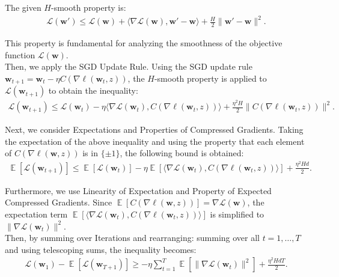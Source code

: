 \documentclass[letterpaper]{article}
\newcommand{\E}{\mathop{\mathbb{E}}}
\renewcommand{\L}{\mathcal{L}}
\newcommand{\bw}{\mathbf{w}}
\begin{document}
\begin{enumerate}
\begin{enumerate}
        The given \(H\)-smooth property is:
         \begin{equation}
        	\begin{aligned}
        		\L(\bw') \le \L(\bw) + \langle \nabla \L(\bw), \bw' - \bw \rangle + \frac{H}{2} \|\bw' - \bw\|^2.
        	\end{aligned}
        \end{equation}

        This property is fundamental for analyzing the smoothness of the objective function \(\L(\bw)\).\\
        
        Then, we apply the SGD Update Rule. Using the SGD update rule \(\bw_{t+1} = \bw_t - \eta C(\nabla \ell(\bw_t, z))\), the \(H\)-smooth property is applied to \(\L(\bw_{t+1})\) to obtain the inequality:
        \begin{equation}
        	\begin{aligned}
        		\L(\bw_{t+1}) \le \L(\bw_t) - \eta \langle \nabla \L(\bw_t), C(\nabla \ell(\bw_t, z)) \rangle + \frac{\eta^2 H}{2} \|C(\nabla \ell(\bw_t, z))\|^2.
        	\end{aligned}
        \end{equation}
        
        Next, we consider Expectations and Properties of Compressed Gradients. Taking the expectation of the above inequality and using the property that each element of \(C(\nabla \ell(\bw,z))\) is in \(\{\pm 1\}\), the following bound is obtained:
        \begin{equation}
        	\begin{aligned}
        		\E[\L(\bw_{t+1})] \le \E[\L(\bw_t)] - \eta \E[\langle \nabla \L(\bw_t), C(\nabla \ell(\bw_t, z)) \rangle] + \frac{\eta^2 H d}{2}.
        	\end{aligned}
        \end{equation}
        
        Furthermore, we use Linearity of Expectation and Property of Expected Compressed Gradients. Since \(\E[C(\nabla \ell(\bw,z))] = \nabla \L(\bw)\), the expectation term \(\E[\langle \nabla \L(\bw_t), C(\nabla \ell(\bw_t, z)) \rangle]\) is simplified to \(\|\nabla \L(\bw_t)\|^2\).\\
        
        Then, by summing over Iterations and rearranging: summing over all \(t = 1, \ldots, T\) and using telescoping sums, the inequality becomes:
        \begin{equation}
        	\begin{aligned}
        		\L(\bw_1) - \E[\L(\bw_{T+1})] \ge -\eta \sum_{t=1}^T \E[\|\nabla \L(\bw_t)\|^2] + \frac{\eta^2 H d T}{2}.
        	\end{aligned}
        \end{equation}
        

\end{enumerate}
\end{enumerate}
\end{document}
